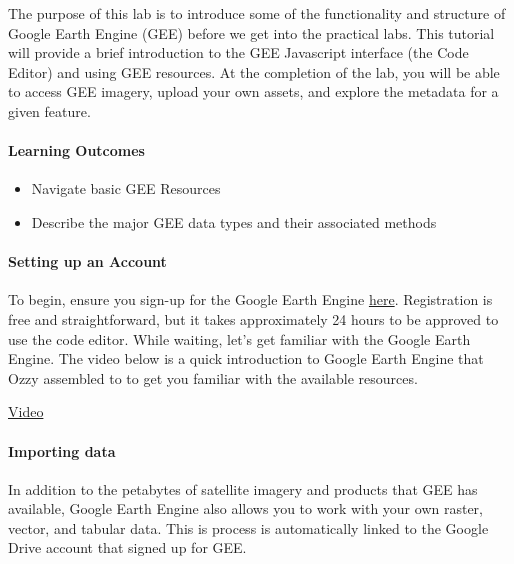 \documentclass[
]{article}
\providecommand{\tightlist}{%
  \setlength{\itemsep}{0pt}\setlength{\parskip}{0pt}}
\begin{document}
The purpose of this lab is to introduce some of the functionality and structure of Google Earth Engine (GEE) before we get into the practical labs. This tutorial will provide a brief introduction to the GEE Javascript interface (the Code Editor) and using GEE resources. At the completion of the lab, you will be able to access GEE imagery, upload your own assets, and explore the metadata for a given feature.

\hypertarget{learning-outcomes}{%
\paragraph*{Learning Outcomes}\label{learning-outcomes}}

\begin{itemize}
\tightlist
\item
  Navigate basic GEE Resources
\item
  Describe the major GEE data types and their associated methods
\end{itemize}

\hypertarget{setting-up-an-account}{%
\paragraph*{Setting up an Account}\label{setting-up-an-account}}

To begin, ensure you sign-up for the Google Earth Engine \href{https://signup.earthengine.google.com}{here}. Registration is free and straightforward, but it takes approximately 24 hours to be approved to use the code editor. While waiting, let's get familiar with the Google Earth Engine. The video below is a quick introduction to Google Earth Engine that Ozzy assembled to to get you familiar with the available resources.

\href{https://www.youtube.com/watch?v=Ypo28T6wPbQ}{Video}

\hypertarget{importing-data}{%
\paragraph*{Importing data}\label{importing-data}}

In addition to the petabytes of satellite imagery and products that GEE has available, Google Earth Engine also allows you to work with your own raster, vector, and tabular data.
This is process is automatically linked to the Google Drive account that signed up for GEE.
\end{document}
